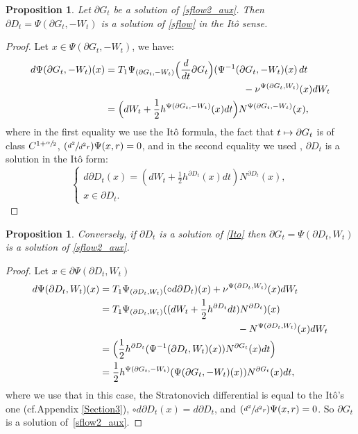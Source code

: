 \documentclass[10pt]{amsart}
\newcommand\mto{\mathchoice{\longmapsto}{\mapsto}{\mapsto}{\mapsto}}
\newcommand{\Psfrac}[2]{(\sfrac{#1}{#2})}
\theoremstyle{plain}
\newtheorem{prop}[thm]{Proposition}
\theoremstyle{definition}
\newcommand{\bqn}[1]{\begin{equation}\label{#1}}
\newcommand{\eqn}{\end{equation}}
\let\f\frac
\providecommand{\cf}{cf.}\providecommand{\etc}{etc.}
\begin{document}
\begin{prop}
Let $ \partial{G}_t$ be a solution of \eqref{sflow2_aux}. Then $\partial D_t = \Psi( \partial G _ t, -W_t)$ is a solution of \eqref{sflow} in the Itô sense.
\end{prop}
\begin{proof}
Let $ x \in \Psi( \partial G _ t, -W_t)$, we have:
\begin{equation}
\begin{split}
d \Psi( \partial G _ t, -W_t) (x)
& = T_1\Psi_{( \partial G _ t, -W_t)} \Bigl(\frac{d}{dt} \partial G_t\Bigr) (\Psi^{-1}(\partial G_ t,-W_t )(x) \,d t \\
&\hspace*{5cm}- \nu^{\Psi( \partial G _ t, \-W_t)}(x) dW_t \\
& =\Bigl(dW_t+\f12h^{\Psi( \partial G _ t, -W_t)}(x)dt\Bigr)N^{\Psi( \partial G _ t, -W_t)}(x),
\end{split}
\end{equation}
where in the first equality we use the Itô formula, the fact that $ t \mto \partial G_t $ is of class $C^{1 + \sfrac{\alpha}{2}} $, $\Psfrac{d^2}{d^2r} \Psi(x,r) = 0$, and in the second equality we used \cite[Lem.\,13]{zbMATH07470497}, \ie $\partial D_t$ is a solution in
the Itô form:
\bqn{Ito}
\begin{cases}
d \partial D_t (x) = (dW_t+\f12h^{\partial D_t}(x)dt)N^{\partial D_t}(x),\\
x \in \partial D_t.
\end{cases}
\eqn

\end{proof}
\begin{prop}
Conversely, if $\partial D_t $ is a solution of \eqref{Ito} then $\partial G _ t = \Psi (\partial D_t, W_t) $ is a solution of \eqref{sflow2_aux}.
\end{prop}

\begin{proof}
Let $x \in \partial \Psi (\partial D_t, W_t) $
\begin{equation}
\begin{split}
d \Psi( \partial D _ t, W_t) (x)
&= T_1\Psi_{( \partial D _ t, W_t)} (\circ d \partial D_t) (x) +\nu^{\Psi( \partial D _ t, W_t)}(x) dW_t \\
&= T_1\Psi_{( \partial D _ t, W_t)} ( (dW_t+\f12h^{\partial D_t}dt)N^{\partial D_t}) (x) \\
&\hspace*{5cm}-N^{\Psi( \partial D _ t,W_t)}(x) dW_t \\
&= \Bigl(\f12h^{\partial D_t}( \Psi^{-1}( \partial D_t, W_t)(x) )N^{\partial G_t}(x) dt\Bigr) \\
&=\f12h^{\Psi( \partial G_t, -W_t)}( \Psi( \partial G_t, -W_t)(x) )N^{\partial G_t}(x) dt,
\end{split}
\end{equation}
where we use that in this case, the Stratonovich differential is equal to the Itô's one (\cf Appendix \ref{Section3}), \ie $\circ d \partial D_t(x) = d \partial D_t $, and $\Psfrac{d^2}{d^2r} \Psi(x,r) = 0$.
So $\partial G _t$ is a solution of~\eqref{sflow2_aux}.
\end{proof}
\end{document}
